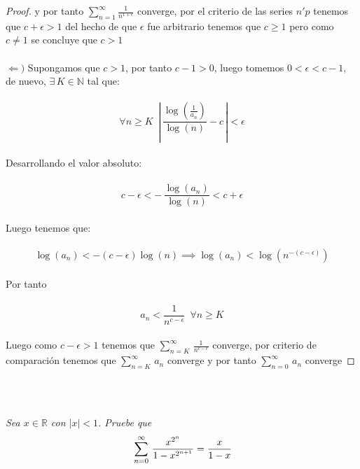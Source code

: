 \documentclass[11pt,letterpaper]{article}
\newcommand{\R}{\mathbb{R}}
\newcommand{\N}{\mathbb{N}}
\begin{document}
\begin{proof}
    y por tanto $\sum_{n=1}^{\infty}\frac{1}{n^{1+\epsilon}}$ converge, por el criterio de las series $n'p$ tenemos que
    $c+\epsilon>1$ del hecho de que $\epsilon$ fue arbitrario tenemos que $c\geq1$ pero como $c\neq 1$ se concluye que $c>1$\,\\
    \,\\
    \newpage
    $\Leftarrow)$\,\,Supongamos que $c>1$, por tanto $c-1>0$, luego tomemos $0<\epsilon<c-1$, de nuevo, 
    $\exists\,K\in \N$ tal que:\,\\
    \,\\
    \begin{equation*}
    \forall n\geq K\,\,\,\left|\,\frac{\log\left(\frac{1}{a_n}\right)}{\log(n)}-c\,\right|<\epsilon
    \end{equation*}\,\\
    Desarrollando el valor absoluto:\,\\
    \,\\
    \begin{equation*}
        c-\epsilon<-\,\frac{\log(a_n)}{\log(n)}<c+\epsilon
    \end{equation*}\,\\
    Luego tenemos que:\,\\
    \,\\
    \begin{equation*}
        \log(a_n)<-(c-\epsilon)\log(n)\implies \log(a_n)<\log(n^{-(c-\epsilon)})
    \end{equation*}\,\\
    Por tanto\,\\
    \,\\
    \begin{equation*}
        a_n<\frac{1}{n^{c-\epsilon}}\,\,\,\forall n\geq K
    \end{equation*}\,\\
    Luego como $c-\epsilon>1$ tenemos que $\sum_{n=K}^{\infty}\,\frac{1}{n^{c-\epsilon}}$ converge, por criterio de 
    comparaci\'on tenemos que $\sum_{n=K}^{\infty}\,a_n$ converge y por tanto $\sum_{n=0}^{\infty}\,a_n$ converge
\end{proof}\,\\
\,\\
\begin{tcolorbox}[
	title = \textcolor{black}{\textcolor{white}{Problema}},]
\textit{Sea $x\in \R$ con $|x|<1$. Pruebe que 
\begin{equation*}
\displaystyle\,\sum_{n=0}^{\infty}\,\frac{x^{2^n}}{1-x^{2^{n+1}}}=\frac{x}{1-x}
\,\\
\end{equation*}
}
\end{tcolorbox}
\end{document}
